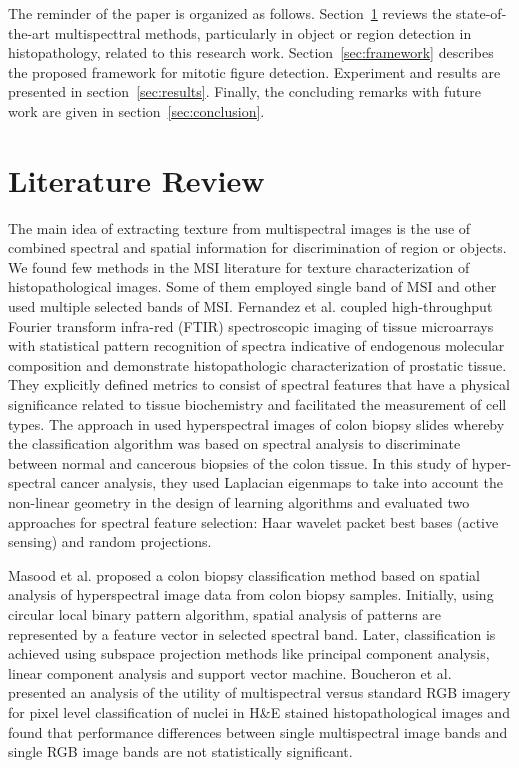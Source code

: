 \documentclass[10pt,twocolumn,letterpaper]{article}
\begin{document}
The reminder of the paper is organized as follows. Section~\ref{sec:previous} reviews the state-of-the-art multispecttral methods, particularly in object or region detection in histopathology, related to this research work. Section~\ref{sec:framework} describes the proposed framework for mitotic figure detection. Experiment and results are presented in section~\ref{sec:results}. Finally, the concluding remarks with future work are given in section~\ref{sec:conclusion}.

\section{Literature Review}
\label{sec:previous}
The main idea of extracting texture from multispectral images is the use of combined spectral and spatial information for discrimination of region or objects. We found few methods in the MSI literature for texture characterization of histopathological images. Some of them employed single band of MSI and other used multiple selected bands of MSI. Fernandez et al. \cite{fernandez2005} coupled high-throughput Fourier transform infra-red (FTIR) spectroscopic imaging of tissue microarrays with statistical pattern recognition of spectra indicative of endogenous molecular composition and demonstrate histopathologic characterization of prostatic tissue. They explicitly defined metrics to consist of spectral features that have a physical significance related to tissue biochemistry and facilitated the measurement of cell types. The approach in \cite{woolfe2006} used hyperspectral images of colon biopsy slides whereby the classification algorithm was based on spectral analysis to discriminate between normal and cancerous biopsies of the colon tissue. In this study of hyper-spectral cancer analysis, they used Laplacian eigenmaps to take into account the non-linear geometry in the design of learning algorithms and evaluated two approaches for spectral feature selection: Haar wavelet packet best bases (active sensing) and random projections.

Masood et al. \cite{masood2009} proposed a colon biopsy classification method based on spatial analysis of hyperspectral image data from colon biopsy samples. Initially, using circular local binary pattern algorithm, spatial analysis of patterns are represented by a feature vector in selected spectral band. Later, classification is achieved using subspace projection methods like principal component analysis, linear component analysis and support vector machine. Boucheron et al. \cite{boucheron2007} presented an analysis of the utility of multispectral versus standard RGB imagery for pixel level classification of nuclei in H\&E stained histopathological images and found that performance differences between single multispectral image bands and single RGB image bands are not statistically significant. 
\end{document}
